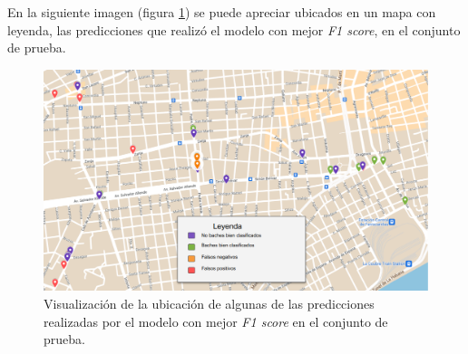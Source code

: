 	En la siguiente imagen (figura \ref{fig:14}) se puede apreciar ubicados en un mapa con leyenda, las predicciones que realizó el modelo con mejor 
	\emph{F1 score}, en el conjunto de prueba.

	\newpage
	\begin{figure}[htb]
		\centering
		\includegraphics[scale = 0.4]{Graphics/map_point_predictions.png}
		\caption{Visualización de la ubicación de algunas de las predicciones realizadas por el modelo con mejor \emph{F1 score} en el conjunto de prueba.}
		\label{fig:14}
	\end{figure}
